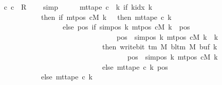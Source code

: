 \begin{isabellebody}
\ \ \isamarkupfalse%
\ {\isachardoublequoteopen}{\isacharparenleft}{\kern0pt}c{}{\isacharcomma}{\kern0pt}\ c{}{\isacharparenright}{\kern0pt}\ {\isasymin}\ R{\isacharprime}{\kern0pt}\ {\isacharcircum}{\kern0pt}{\isacharcircum}{\kern0pt}\ {}{\isachardoublequoteclose}\ \isamarkupfalse%
\ simp\isanewline
\ \ \isamarkupfalse%
\ \isamarkupfalse%
\ {\isachardoublequoteopen}mt{\isacharunderscore}{\kern0pt}tape\ c{}\ {\isacharequal}{\kern0pt}\ {\isacharparenleft}{\kern0pt}{\isasymlambda}k{\isachardot}{\kern0pt}\ if\ k{\isacharunderscore}{\kern0pt}idx\ k\ {\isacharless}{\kern0pt}\ {}\isanewline
\ \ \ \ \ \ \ \ \ \ \ \ \ \ then\ {\isacharparenleft}{\kern0pt}if\ mt{\isacharunderscore}{\kern0pt}pos\ cM\ k\ {\isacharequal}{\kern0pt}\ {}\ then\ mt{\isacharunderscore}{\kern0pt}tape\ c{}\ k\isanewline
\ \ \ \ \ \ \ \ \ \ \ \ \ \ \ \ \ \ \ \ else\ {\isacharparenleft}{\kern0pt}{\isasymlambda}pos{\isachardot}{\kern0pt}\ if\ sim{\isacharunderscore}{\kern0pt}pos\ {\isacharquery}{\kern0pt}k\ {\isacharparenleft}{\kern0pt}mt{\isacharunderscore}{\kern0pt}pos\ cM\ k{\isacharparenright}{\kern0pt}\ {\isasymle}\ pos\isanewline
\ \ \ \ \ \ \ \ \ \ \ \ \ \ \ \ \ \ \ \ \ \ \ \ \ \ \ \ \ \ \ \ \ \ {\isasymand}\ pos\ {\isacharless}{\kern0pt}\ sim{\isacharunderscore}{\kern0pt}pos\ {\isacharquery}{\kern0pt}k\ {\isacharparenleft}{\kern0pt}mt{\isacharunderscore}{\kern0pt}pos\ cM\ k{\isacharparenright}{\kern0pt}\ {\isacharplus}{\kern0pt}\ {\isacharquery}{\kern0pt}k\isanewline
\ \ \ \ \ \ \ \ \ \ \ \ \ \ \ \ \ \ \ \ \ \ \ \ \ \ \ \ \ \ \ then\ write{\isacharunderscore}{\kern0pt}bit\ {\isacharparenleft}{\kern0pt}{\isasymGamma}{\isacharunderscore}{\kern0pt}tm\ M{\isacharparenright}{\kern0pt}\ {\isacharparenleft}{\kern0pt}bl{\isacharunderscore}{\kern0pt}tm\ M{\isacharparenright}{\kern0pt}\ {\isacharparenleft}{\kern0pt}buf\ k{\isacharparenright}{\kern0pt}\isanewline
\ \ \ \ \ \ \ \ \ \ \ \ \ \ \ \ \ \ \ \ \ \ \ \ \ \ \ \ \ \ \ \ \ \ \ \ \ \ {\isacharparenleft}{\kern0pt}pos\ {\isacharminus}{\kern0pt}\ sim{\isacharunderscore}{\kern0pt}pos\ {\isacharquery}{\kern0pt}k\ {\isacharparenleft}{\kern0pt}mt{\isacharunderscore}{\kern0pt}pos\ cM\ k{\isacharparenright}{\kern0pt}{\isacharparenright}{\kern0pt}\isanewline
\ \ \ \ \ \ \ \ \ \ \ \ \ \ \ \ \ \ \ \ \ \ \ \ \ \ \ \ \ \ \ else\ mt{\isacharunderscore}{\kern0pt}tape\ c{}\ k\ pos{\isacharparenright}{\kern0pt}{\isacharparenright}{\kern0pt}\isanewline
\ \ \ \ \ \ \ \ \ \ \ \ \ \ else\ mt{\isacharunderscore}{\kern0pt}tape\ c{}\ k{\isacharparenright}{\kern0pt}{\isachardoublequoteclose}\isanewline

\end{isabellebody}
